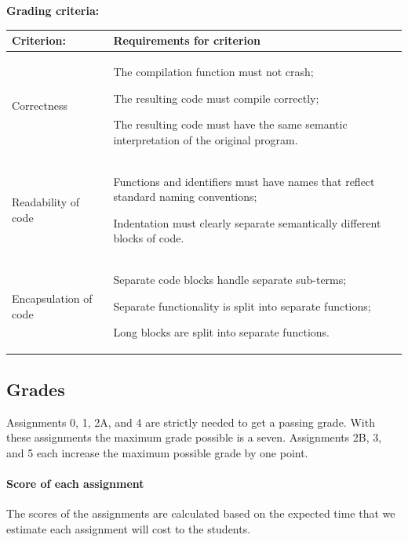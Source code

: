 \documentclass[a4paper, 10pt]{article}
\begin{document}
			\textbf{Grading criteria:} \\
				\begin{tabularx}{\textwidth}{|>{\columncolor{lichtGrijs}} X | p{}|}
					\hline
					\textbf{Criterion:} & \textbf{Requirements for criterion} \\
					\hline
					Correctness & 
						\begin{inparaenum}
							\item The compilation function must not crash;
							\item The resulting code must compile correctly;
							\item The resulting code must have the same semantic interpretation of the original program.
						\end{inparaenum} \\
					
					\hline
					Readability of code & 
						\begin{inparaenum}
							\item Functions and identifiers must have names that reflect standard naming conventions;
							\item Indentation must clearly separate semantically different blocks of code.
						\end{inparaenum} \\
					\hline
					Encapsulation of code & 
						\begin{inparaenum}
							\item Separate code blocks handle separate sub-terms;
							\item Separate functionality is split into separate functions;
							\item Long blocks are split into separate functions.
						\end{inparaenum} \\
					\hline
				\end{tabularx}			

			
	\subsection{Grades}
		Assignments 0, 1, 2A, and 4 are strictly needed to get a passing grade. With these assignments the maximum grade possible is a seven. Assignments 2B, 3, and 5 each increase the maximum possible grade by one point. \\
				
		\paragraph*{Score of each assignment}
			The scores of the assignments are calculated based on the expected time that we estimate each assignment will cost to the students. \\
		
\end{document}

